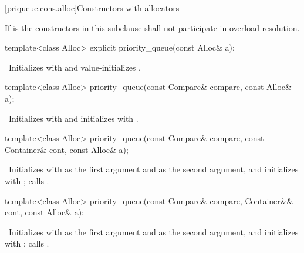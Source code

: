 [priqueue.cons.alloc]{Constructors with allocators}

\pnum
If  is 
the constructors in this subclause shall not participate in overload resolution.

%
\begin{itemdecl}
template<class Alloc> explicit priority_queue(const Alloc& a);
\end{itemdecl}

\begin{itemdescr}
\pnum
\effects\ Initializes  with  and value-initializes .
\end{itemdescr}

%
\begin{itemdecl}
template<class Alloc> priority_queue(const Compare& compare, const Alloc& a);
\end{itemdecl}

\begin{itemdescr}
\pnum
\effects\ Initializes  with  and initializes  with .
\end{itemdescr}

%
\begin{itemdecl}
template<class Alloc>
  priority_queue(const Compare& compare, const Container& cont, const Alloc& a);
\end{itemdecl}

\begin{itemdescr}
\pnum
\effects\ Initializes  with  as the first argument and  as the second
argument, and initializes  with ;
calls .
\end{itemdescr}

%
\begin{itemdecl}
template<class Alloc>
  priority_queue(const Compare& compare, Container&& cont, const Alloc& a);
\end{itemdecl}

\begin{itemdescr}
\pnum
\effects\ Initializes  with  as the first argument and 
as the second argument, and initializes  with ;
calls .
\end{itemdescr}

